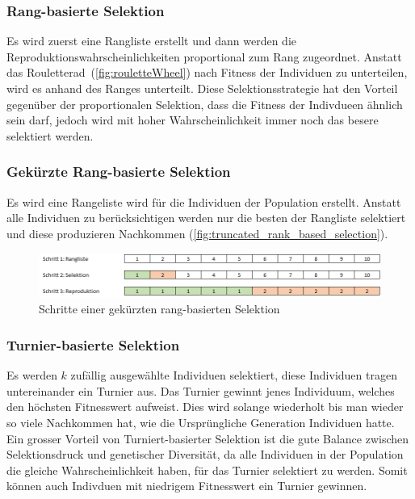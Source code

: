       \subsubsection{Rang-basierte Selektion}

        Es wird zuerst eine Rangliste erstellt und dann werden die Reproduktionswahrscheinlichkeiten proportional zum Rang zugeordnet.
        Anstatt das Rouletterad~(\vref{fig:rouletteWheel}) nach Fitness der Individuen zu unterteilen, wird es anhand des Ranges unterteilt.
        Diese Selektionsstrategie hat den Vorteil gegenüber der proportionalen Selektion,
        dass die Fitness der Indivdueen ähnlich sein darf, jedoch wird mit hoher Wahrscheinlichkeit immer noch das besere selektiert werden.

      \subsubsection{Gekürzte Rang-basierte Selektion}

        Es wird eine Rangeliste wird für die Individuen der Population erstellt.
        Anstatt alle Individuen zu berücksichtigen werden nur die besten der Rangliste selektiert und diese produzieren Nachkommen (\vref{fig:truncated_rank_based_selection}).

        \begin{figure}[H]
          \includegraphics[scale=0.7, center]{graphics/truncated_rank_based_selection}
          \caption{Schritte einer gekürzten rang-basierten Selektion \label{fig:truncated_rank_based_selection}}
        \end{figure}


      \subsubsection{Turnier-basierte Selektion\label{par:Turnier}}

        Es werden \(k\) zufällig ausgewählte Individuen selektiert, diese Individuen tragen untereinander ein Turnier aus.
        Das Turnier gewinnt jenes Individuum, welches den höchsten Fitnesswert aufweist.
        Dies wird solange wiederholt bis man wieder so viele Nachkommen hat,
        wie die Ursprüngliche Generation Individuen hatte.
        Ein grosser Vorteil von Turniert-basierter Selektion ist die gute Balance zwischen
        Selektionsdruck und genetischer Diversität, da alle Individuen in der Population die gleiche Wahrscheinlichkeit haben, für das Turnier selektiert zu werden.
        Somit können auch Indivduen mit niedrigem Fitnesswert ein Turnier gewinnen.


